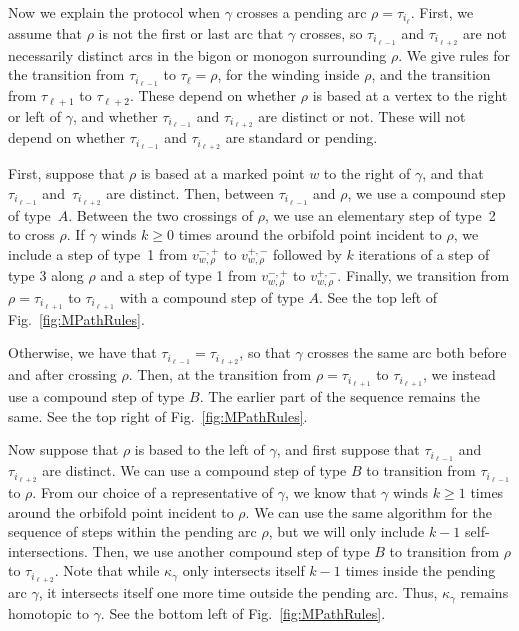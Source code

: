 \documentclass[11pt]{article}
\numberwithin{equation}{section}
\begin{document}
Now we explain the protocol when $\gamma$ crosses a pending arc $\rho = \tau_{i_\ell}$. First, we assume that $\rho$ is not the first or last arc that $\gamma$ crosses, so $\tau_{i_{\ell-1}}$ and $\tau_{i_{\ell+2}}$ are not necessarily distinct arcs in the bigon or monogon surrounding $\rho$. We give rules for the transition from $\tau_{i_{\ell-1}}$ to $\tau_\ell = \rho$, for the winding inside $\rho$, and the transition from $\tau_{\ell+1}$ to $\tau_{\ell+2}$. These depend on whether $\rho$ is based at a vertex to the right or left of $\gamma$, and whether $\tau_{i_{\ell-1}}$ and $\tau_{i_{\ell+2}}$ are distinct or not. These will not depend on whether $\tau_{i_{\ell-1}}$ and $\tau_{i_{\ell+2}}$ are standard or pending.


First, suppose that $\rho$ is based at a marked point $w$ to the right of $\gamma$, and that~$\tau_{i_{\ell-1}}$ and~$\tau_{i_{\ell+2}}$ are distinct. Then, between $\tau_{i_{\ell-1}}$ and $\rho$, we use a compound step of type~$A$. Between the two crossings of $\rho$, we use an elementary step of type~2 to cross $\rho$. If $\gamma$ winds $k \geq 0$ times around the orbifold point incident to $\rho$, we include a step of type~1 from $v^{-,+}_{w,\rho}$ to $v^{+,-}_{w,\rho}$ followed by $k$ iterations of a step of type 3 along $\rho$ and a step of type 1 from $v^{-,+}_{w,\rho}$ to $v^{+,-}_{w,\rho}$. Finally, we transition from $\rho = \tau_{i_{\ell+1}}$ to $\tau_{i_{\ell+1}}$ with a compound step of type $A$. See the top left of Fig.~\ref{fig:MPathRules}.

Otherwise, we have that $\tau_{i_{\ell-1}} = \tau_{i_{\ell+2}}$, so that $\gamma$ crosses the same arc both before and after crossing $\rho$. Then, at the transition from $\rho = \tau_{i_{\ell+1}}$ to $\tau_{i_{\ell+1}}$, we instead use a compound step of type $B$. The earlier part of the sequence remains the same. See the top right of Fig.~\ref{fig:MPathRules}.

Now suppose that $\rho$ is based to the left of $\gamma$, and first suppose that $\tau_{i_{\ell-1}}$ and $\tau_{i_{\ell+2}}$ are distinct. We can use a compound step of type $B$ to transition from $\tau_{i_{\ell-1}}$ to $\rho$. From our choice of a representative of $\gamma$, we know that $\gamma$ winds $k \geq 1$ times around the orbifold point incident to $\rho$. We can use the same algorithm for the sequence of steps within the pending arc $\rho$, but we will only include $k-1$ self-intersections. Then, we use another compound step of type $B$ to transition from $\rho$ to $\tau_{i_{\ell+2}}$. Note that while $\kappa_\gamma$ only intersects itself $k-1$ times inside the pending arc $\gamma$, it intersects itself one more time outside the pending arc. Thus, $\kappa_\gamma$ remains homotopic to $\gamma$. See the bottom left of Fig.~\ref{fig:MPathRules}.
\end{document}
